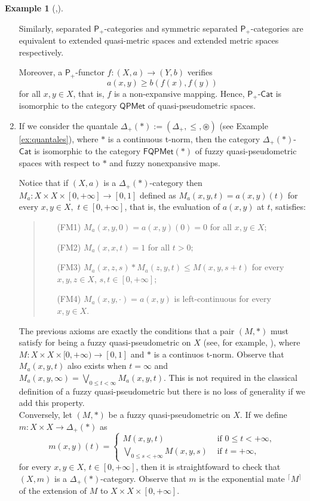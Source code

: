 \documentclass[11pt,a4paper]{amsart}
\theoremstyle{definition}
\newtheorem{example}[theorem]{Example}
\providecommand{\ceil}[1]{{}^\lceil #1 {}^\rceil}
\begin{document}
\begin{example}[\mbox{\cite[Examples III.1.3.1]{BookMonoidalTopology},\cite{HofReis13}}]
\begin{enumerate}[(1)]
			Similarly, separated $\mathsf{P}_+$-categories and symmetric separated $\mathsf{P}_+$-categories are equivalent to extended quasi-metric spaces and extended metric spaces respectively.
			
			Moreover, a $\mathsf{P}_+$-functor $f:(X,a)\to (Y,b)$ verifies
			$$a(x,y)\geq b(f(x),f(y))$$
			for all $x,y\in X$, that is, $f$ is a non-expansive mapping. Hence, $\mathsf{P}_+$-$\mathsf{Cat}$ is isomorphic to the category $\mathsf{QPMet}$ of quasi-pseudometric spaces. 
			
			\item If we consider the quantale $\Delta_+(\ast):=(\Delta_+,\leq,\circledast
			)$ (see Example \ref{ex:quantales}), where $\ast$ is a continuous t-norm, then the category $\Delta_+(\ast)$-$\mathsf{Cat}$ is isomorphic to the category $\mathsf{FQPMet}(\ast)$ of fuzzy quasi-pseudometric spaces with respect to $\ast$ and fuzzy nonexpansive maps. 
			
			Notice that if $(X,a)$ is a $\Delta_+(\ast)$-category then $M_a:X\times X\times [0,+\infty]
			\to [0,1]$ defined as $M_a(x,y,t)=a(x,y)(t)$ for every $x,y\in X,$ $t\in [0,+\infty]$, that is, the evaluation of $a(x,y)$ at $t$, satisfies:
			\begin{quote}
				\begin{itemize}
					\item[(FM1)] $M_a(x,y,0)=a(x,y)(0)=0$ for all $x,y\in X;$
					\item[(FM2)] $M_a(x,x,t)=1$ for all $t>0;$
					\item[(FM3)] $M_a(x,z,s)\ast M_a(z,y,t)\leq M(x,y,s+t)$ for every $x,y,z\in X$, $s,t\in [0,+\infty];$
					\item[(FM4)] $M_a(x,y,\cdot)=a(x,y)$ is left-continuous for every $x,y\in X.$
				\end{itemize}
			\end{quote}
			The previous axioms are exactly the conditions that a pair $(M,\ast)$ must satisfy for being a fuzzy quasi-pseudometric on $X$ (see, for example, \cite{GregRo04}), where $M:X\times X\times [0,+\infty)\to [0,1]$ and $\ast$ is a continuos t-norm. Observe that $M_a(x,y,t)$ also exists when $t=\infty$ and $M_a(x,y,\infty)=\bigvee_{0\leq t<\infty} M_a(x,y,t).$ This is not required in the classical definition of a fuzzy quasi-pseudometric but there is no loss of generality if we add this property.\\
			Conversely, let $(M,\ast)$ be a fuzzy quasi-pseudometric on $X.$ If we define $m:X\times X\to\Delta_+(\ast)$ as
			$$m(x,y)(t)=\begin{cases}
				M(x,y,t) &\text{ if } 0\leq t < +\infty,\\
				\bigvee\limits_{0\leq s<+\infty} M(x,y,s)&\text{ if } t=+\infty,
			\end{cases}$$
			for every $x,y\in X$, $t\in [0,+\infty]$, then it is straightfoward to check that $(X,m)$ is a $\Delta_+(\ast)$-category. Observe that $m$ is the exponential mate $\ceil{M}$ of the extension of $M$ to $X\times X\times [0,+\infty].$
			
		\end{enumerate}
	\end{example}
\end{document}
